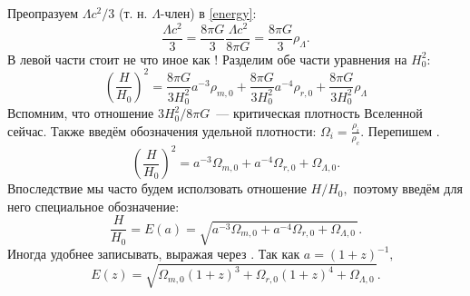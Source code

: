 Преопразуем $\Lambda c^2 / 3$ (т. н. $\Lambda$-член) в \eqref{energy}:
$$
\frac{\Lambda c^2}{3} = \frac{8 \pi G}{3} \frac{\Lambda c^2}{8 \pi G} = \frac{8 \pi G}{3} \rho_{\Lambda}.
$$
В левой части  стоит не что иное как ! Разделим обе части уравнения на $H_{0}^{2}$:
\begin{equation}
\left(\frac{H}{H_0}\right)^2 = \frac{8\pi G}{3H_{0}^{2}} a^{-3} \rho_{m,0} + \frac{8\pi G}{3H_{0}^{2}} a^{-4} \rho_{r,0} + \frac{8 \pi G}{3H_{0}^{2}} \rho_{\Lambda}
\end{equation}
Вспомним, что отношение $3H_{0}^{2} / 8 \pi G$~--- критическая плотность Вселенной сейчас. Также введём обозначения удельной плотности: $\Omega_{i} = \displaystyle \frac{\rho_i}{\rho_c}.$ Перепишем .
\begin{equation}
\left(\frac{H}{H_0}\right)^2 = a^{-3} \Omega_{m,0} + a^{-4} \Omega_{r,0} + \Omega_{\Lambda,0}.
\end{equation}
Впоследствие мы часто будем исползовать отношение $H / H_0,$ поэтому введём для него специальное обозначение:
\begin{equation}
\frac{H}{H_0} = E(a) = \sqrt{a^{-3} \Omega_{m,0} + a^{-4} \Omega_{r,0} + \Omega_{\Lambda,0}\,}.
\label{energa}
\end{equation}
Иногда  удобнее записывать, выражая  через . Так как $a = (1+z)^{-1},$ 
\begin{equation}
E(z) = \sqrt{\Omega_{m,0}(1+z)^{3} + \Omega_{r,0}(1+z)^{4} + \Omega_{\Lambda,0}\,}.
\end{equation}